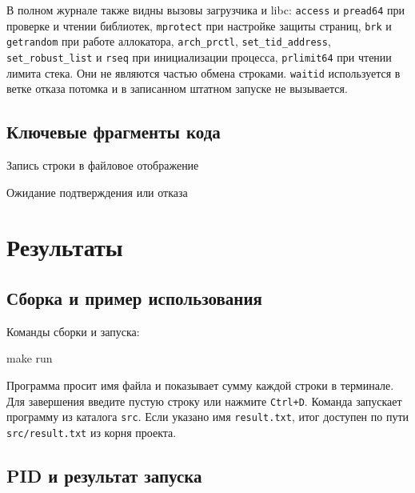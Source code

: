 \documentclass[12pt,a4paper]{article}
\begin{document}
В полном журнале также видны вызовы загрузчика и libc: \texttt{access} и \texttt{pread64} при проверке и чтении библиотек, \texttt{mprotect} при настройке защиты страниц, \texttt{brk} и \texttt{getrandom} при работе аллокатора, \texttt{arch\_prctl}, \texttt{set\_tid\_address}, \texttt{set\_robust\_list} и \texttt{rseq} при инициализации процесса, \texttt{prlimit64} при чтении лимита стека. Они не являются частью обмена строками. \texttt{waitid} используется в ветке отказа потомка и в записанном штатном запуске не вызывается.

\subsection{Ключевые фрагменты кода}

\noindent\begin{minipage}{\linewidth}
\begin{listingblock}{Запись строки в файловое отображение}
\end{listingblock}
\end{minipage}\par

\noindent\begin{minipage}{\linewidth}
\begin{listingblock}{Ожидание подтверждения или отказа}
\end{listingblock}
\end{minipage}\par

\section{Результаты}
\subsection{Сборка и пример использования}
Команды сборки и запуска:
\begin{terminal}
make run
\end{terminal}
Программа просит имя файла и показывает сумму каждой строки в терминале. Для завершения введите пустую строку или нажмите \texttt{Ctrl+D}. Команда запускает программу из каталога \texttt{src}. Если указано имя \texttt{result.txt}, итог доступен по пути \texttt{src/result.txt} из корня проекта.

\subsection{PID и результат запуска}
\end{document}
